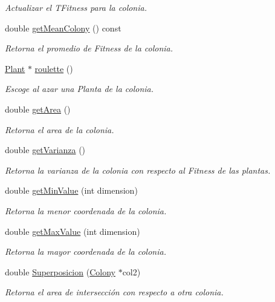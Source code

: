 \begin{DoxyCompactItemize}
\begin{DoxyCompactList}\small\item\em Actualizar el T\+Fitness para la colonia. \end{DoxyCompactList}\item 
double \hyperlink{class_colony_a396ffff8734870bb149f6205eede5443}{get\+Mean\+Colony} () const 
\begin{DoxyCompactList}\small\item\em Retorna el promedio de Fitness de la colonia. \end{DoxyCompactList}\item 
\hyperlink{class_plant}{Plant} $\ast$ \hyperlink{class_colony_a095984a4b9d66dccd04512f77b70fbe9}{roulette} ()
\begin{DoxyCompactList}\small\item\em Escoge al azar una Planta de la colonia. \end{DoxyCompactList}\item 
double \hyperlink{class_colony_adaa8bc27180fe9b61656acb6185250b7}{get\+Area} ()
\begin{DoxyCompactList}\small\item\em Retorna el area de la colonia. \end{DoxyCompactList}\item 
double \hyperlink{class_colony_ac985894236686089847cc80eef0df3c0}{get\+Varianza} ()
\begin{DoxyCompactList}\small\item\em Retorna la varianza de la colonia con respecto al Fitness de las plantas. \end{DoxyCompactList}\item 
double \hyperlink{class_colony_ac59ef383ec4d254fef1326b33812fd66}{get\+Min\+Value} (int dimension)
\begin{DoxyCompactList}\small\item\em Retorna la menor coordenada de la colonia. \end{DoxyCompactList}\item 
double \hyperlink{class_colony_a177a36f388719982d16c2abcacef85a3}{get\+Max\+Value} (int dimension)
\begin{DoxyCompactList}\small\item\em Retorna la mayor coordenada de la colonia. \end{DoxyCompactList}\item 
double \hyperlink{class_colony_a7f27439201f57d52df38115c10f41bf2}{Superposicion} (\hyperlink{class_colony}{Colony} $\ast$col2)
\begin{DoxyCompactList}\small\item\em Retorna el area de intersección con respecto a otra colonia. \end{DoxyCompactList}\item 

\end{DoxyCompactItemize}
